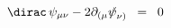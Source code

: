 \begin{equation}
\dirac \, \psi_{\mu\nu} - 2 \partial_{( \mu} {{\not}\psi}_{\nu )} \;\;
=\;\; 0
\label{eq:3.1}
\end{equation}

